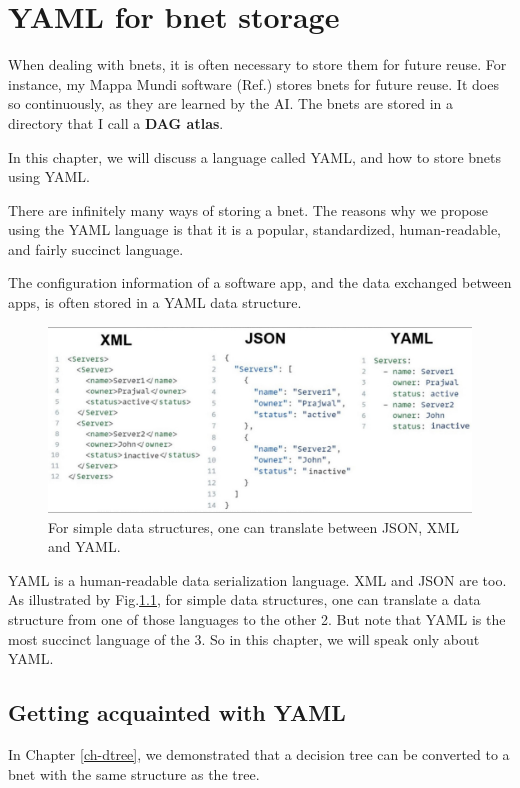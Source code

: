 \chapter{YAML for bnet storage}

When dealing with bnets,
it is often necessary to store
them for future reuse.
 For instance, my Mappa Mundi
software (Ref.\cite{mappa-mundi}) stores
bnets
for future reuse. It does so
continuously, 
as they are learned by the AI. The bnets are stored in a directory that I call a {\bf DAG atlas}.

In this chapter, we will discuss a language called YAML, 
and how to store bnets using YAML.



There are infinitely many ways of storing a bnet. 
The reasons why we propose using the YAML
language is that it is a popular,
standardized,
human-readable, and fairly succinct language.

The configuration information of a software app, and the data exchanged between apps,  is often stored in a  YAML data structure.

\begin{figure}[h!]
\centering
\includegraphics[width=6in]
{yaml/json-xml-yaml.jpg}
\caption{For simple data structures,
one can translate between JSON, XML and YAML.}
\label{fig-json-xml-yaml}
\end{figure}

YAML is a human-readable data serialization language.
XML and JSON are too.
As illustrated by Fig.\ref{fig-json-xml-yaml}, for simple data structures, one can translate a data structure
from one of those languages to the other 2. 
But note that
YAML is the most succinct 
language of the 3.
So in this chapter, we will speak only about YAML.

\section{Getting acquainted with YAML}
In Chapter \ref{ch-dtree},
we demonstrated that a decision tree
can be converted to a bnet with the
same structure as the tree.

